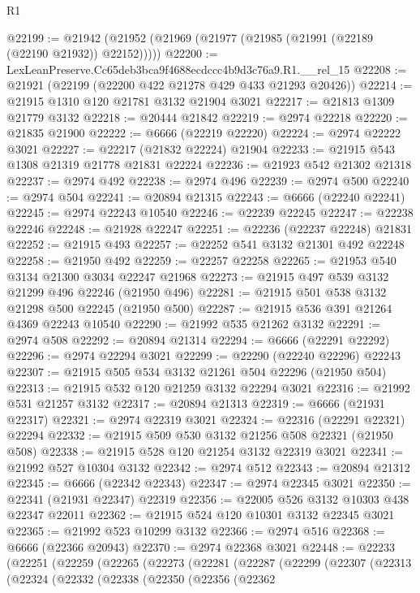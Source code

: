 \begin{lexlean}{R1}
\begin{coremodule}
@22199 := @21942 (@21952 (@21969 (@21977 (@21985 (@21991 (@22189 (@22190 @21932)) @22152)))))
@22200 := LexLeanPreserve.Cc65deb3bca9f4688ecdccc4b9d3c76a9.R1.__rel_15
@22208 := @21921 (@22199 (@22200 @422 @21278 @429 @433 @21293 @20426))
@22214 := @21915 @1310 @120 @21781 @3132 @21904 @3021
@22217 := @21813 @1309 @21779 @3132
@22218 := @20444 @21842
@22219 := @2974 @22218
@22220 := @21835 @21900
@22222 := @6666 (@22219 @22220)
@22224 := @2974 @22222 @3021
@22227 := @22217 (@21832 @22224) @21904
@22233 := @21915 @543 @1308 @21319 @21778 @21831 @22224
@22236 := @21923 @542 @21302 @21318
@22237 := @2974 @492
@22238 := @2974 @496
@22239 := @2974 @500
@22240 := @2974 @504
@22241 := @20894 @21315
@22243 := @6666 (@22240 @22241)
@22245 := @2974 @22243 @10540
@22246 := @22239 @22245
@22247 := @22238 @22246
@22248 := @21928 @22247
@22251 := @22236 (@22237 @22248) @21831
@22252 := @21915 @493
@22257 := @22252 @541 @3132 @21301 @492 @22248
@22258 := @21950 @492
@22259 := @22257 @22258
@22265 := @21953 @540 @3134 @21300 @3034 @22247 @21968
@22273 := @21915 @497 @539 @3132 @21299 @496 @22246 (@21950 @496)
@22281 := @21915 @501 @538 @3132 @21298 @500 @22245 (@21950 @500)
@22287 := @21915 @536 @391 @21264 @4369 @22243 @10540
@22290 := @21992 @535 @21262 @3132
@22291 := @2974 @508
@22292 := @20894 @21314
@22294 := @6666 (@22291 @22292)
@22296 := @2974 @22294 @3021
@22299 := @22290 (@22240 @22296) @22243
@22307 := @21915 @505 @534 @3132 @21261 @504 @22296 (@21950 @504)
@22313 := @21915 @532 @120 @21259 @3132 @22294 @3021
@22316 := @21992 @531 @21257 @3132
@22317 := @20894 @21313
@22319 := @6666 (@21931 @22317)
@22321 := @2974 @22319 @3021
@22324 := @22316 (@22291 @22321) @22294
@22332 := @21915 @509 @530 @3132 @21256 @508 @22321 (@21950 @508)
@22338 := @21915 @528 @120 @21254 @3132 @22319 @3021
@22341 := @21992 @527 @10304 @3132
@22342 := @2974 @512
@22343 := @20894 @21312
@22345 := @6666 (@22342 @22343)
@22347 := @2974 @22345 @3021
@22350 := @22341 (@21931 @22347) @22319
@22356 := @22005 @526 @3132 @10303 @438 @22347 @22011
@22362 := @21915 @524 @120 @10301 @3132 @22345 @3021
@22365 := @21992 @523 @10299 @3132
@22366 := @2974 @516
@22368 := @6666 (@22366 @20943)
@22370 := @2974 @22368 @3021
@22448 := @22233
    (@22251
      (@22259
        (@22265
          (@22273
            (@22281
              (@22287
                (@22299
                  (@22307
                    (@22313
                      (@22324
                        (@22332
                          (@22338
                            (@22350
                              (@22356
                                (@22362

\end{coremodule}
\end{lexlean}
